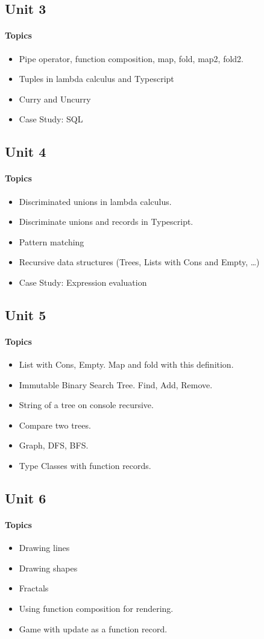 \subsection*{Unit 3}
\paragraph*{Topics}			
\begin{itemize}[noitemsep]
	\item Pipe operator, function composition, map, fold, map2, fold2.
  \item Tuples in lambda calculus and Typescript
  \item Curry and Uncurry
  \item Case Study: SQL
\end{itemize}

\subsection*{Unit 4}
\paragraph*{Topics}			
\begin{itemize}[noitemsep]
	\item Discriminated unions in lambda calculus.
  \item Discriminate unions and records in Typescript.
  \item Pattern matching
  \item Recursive data structures (Trees, Lists with Cons and Empty, …)
  \item Case Study: Expression evaluation  
\end{itemize}

\subsection*{Unit 5}
\paragraph*{Topics}
\begin{itemize}[noitemsep]
  \item List with Cons, Empty. Map and fold with this definition.
  \item Immutable Binary Search Tree. Find, Add, Remove.
  \item String of a tree on console recursive.
  \item Compare two trees.
  \item Graph, DFS, BFS.
  \item Type Classes with function records. 
\end{itemize}

\subsection*{Unit 6}
\paragraph*{Topics}
\begin{itemize}[noitemsep]
  \item Drawing lines
  \item Drawing shapes
  \item Fractals
  \item Using function composition for rendering.
  \item Game with update as a function record.
\end{itemize}
